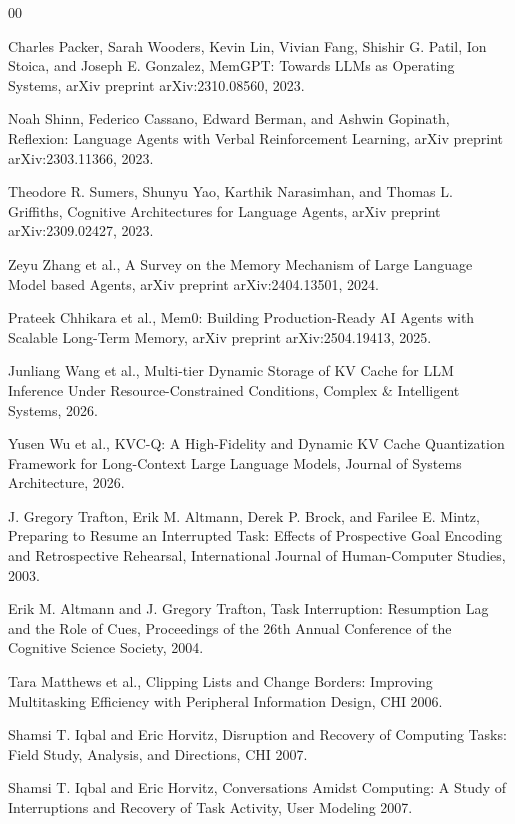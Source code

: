 \documentclass[a4paper,fleqn]{cas-dc}
\begin{document}
\begin{thebibliography}{00}

Charles Packer, Sarah Wooders, Kevin Lin, Vivian Fang, Shishir G. Patil, Ion Stoica, and Joseph E. Gonzalez, MemGPT: Towards LLMs as Operating Systems, arXiv preprint arXiv:2310.08560, 2023.

Noah Shinn, Federico Cassano, Edward Berman, and Ashwin Gopinath, Reflexion: Language Agents with Verbal Reinforcement Learning, arXiv preprint arXiv:2303.11366, 2023.

Theodore R. Sumers, Shunyu Yao, Karthik Narasimhan, and Thomas L. Griffiths, Cognitive Architectures for Language Agents, arXiv preprint arXiv:2309.02427, 2023.

Zeyu Zhang et al., A Survey on the Memory Mechanism of Large Language Model based Agents, arXiv preprint arXiv:2404.13501, 2024.

Prateek Chhikara et al., Mem0: Building Production-Ready AI Agents with Scalable Long-Term Memory, arXiv preprint arXiv:2504.19413, 2025.

Junliang Wang et al., Multi-tier Dynamic Storage of KV Cache for LLM Inference Under Resource-Constrained Conditions, Complex \& Intelligent Systems, 2026.

Yusen Wu et al., KVC-Q: A High-Fidelity and Dynamic KV Cache Quantization Framework for Long-Context Large Language Models, Journal of Systems Architecture, 2026.

J. Gregory Trafton, Erik M. Altmann, Derek P. Brock, and Farilee E. Mintz, Preparing to Resume an Interrupted Task: Effects of Prospective Goal Encoding and Retrospective Rehearsal, International Journal of Human-Computer Studies, 2003.

Erik M. Altmann and J. Gregory Trafton, Task Interruption: Resumption Lag and the Role of Cues, Proceedings of the 26th Annual Conference of the Cognitive Science Society, 2004.

Tara Matthews et al., Clipping Lists and Change Borders: Improving Multitasking Efficiency with Peripheral Information Design, CHI 2006.

Shamsi T. Iqbal and Eric Horvitz, Disruption and Recovery of Computing Tasks: Field Study, Analysis, and Directions, CHI 2007.

Shamsi T. Iqbal and Eric Horvitz, Conversations Amidst Computing: A Study of Interruptions and Recovery of Task Activity, User Modeling 2007.


\end{thebibliography}
\end{document}
